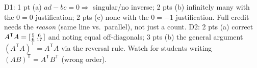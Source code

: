 \documentclass[10pt]{article}
\newcommand{\tp}{\mathsf{T}}
\begin{document}
\begin{teachernote}
D1: 1 pt (a) $ad-bc=0\Rightarrow$ singular/no inverse; 2 pts (b) infinitely many with the $0=0$
justification; 2 pts (c) none with the $0=-1$ justification. Full credit needs the \emph{reason}
(same line vs.\ parallel), not just a count. D2: 2 pts (a) correct
$A^{\tp}A=\begin{bsmallmatrix}5&6\\6&17\end{bsmallmatrix}$ and noting equal off-diagonals; 3 pts (b)
the general argument $(A^{\tp}A)^{\tp}=A^{\tp}A$ via the reversal rule. Watch for students
writing $(AB)^{\tp}=A^{\tp}B^{\tp}$ (wrong order).
\end{teachernote}
\end{document}
